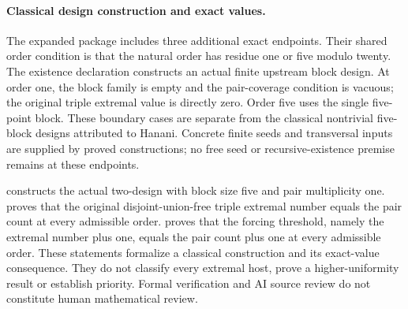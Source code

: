 
\paragraph{Classical design construction and exact values.}
The expanded package includes three additional exact endpoints. Their shared order condition is that the natural order has residue one or five modulo twenty. The existence declaration constructs an actual finite upstream block design. At order one, the block family is empty and the pair-coverage condition is vacuous; the original triple extremal value is directly zero. Order five uses the single five-point block. These boundary cases are separate from the classical nontrivial five-block designs attributed to Hanani. Concrete finite seeds and transversal inputs are supplied by proved constructions; no free seed or recursive-existence premise remains at these endpoints.

 constructs the actual two-design with block size five and pair multiplicity one.  proves that the original disjoint-union-free triple extremal number equals the pair count at every admissible order.  proves that the forcing threshold, namely the extremal number plus one, equals the pair count plus one at every admissible order. These statements formalize a classical construction and its exact-value consequence. They do not classify every extremal host, prove a higher-uniformity result or establish priority. Formal verification and AI source review do not constitute human mathematical review.


